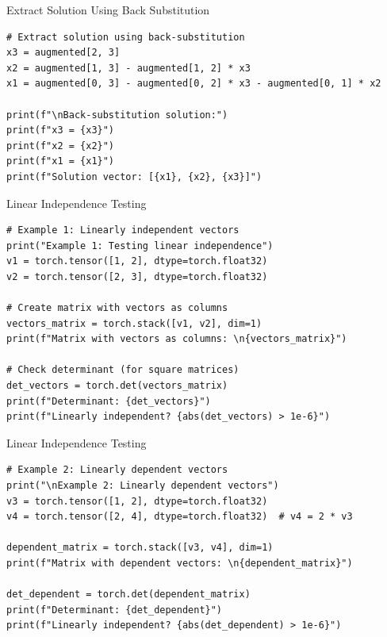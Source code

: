 \documentclass[aspectratio=169,xcolor=dvipsnames,svgnames,x11names,fleqn]{beamer}
\begin{document}
\begin{frame}[containsverbatim]{Extract Solution Using Back Substitution}
\begin{verbatim}
# Extract solution using back-substitution
x3 = augmented[2, 3]
x2 = augmented[1, 3] - augmented[1, 2] * x3
x1 = augmented[0, 3] - augmented[0, 2] * x3 - augmented[0, 1] * x2

print(f"\nBack-substitution solution:")
print(f"x3 = {x3}")
print(f"x2 = {x2}")
print(f"x1 = {x1}")
print(f"Solution vector: [{x1}, {x2}, {x3}]")
\end{verbatim}
\end{frame}



\begin{frame}[containsverbatim]{Linear Independence Testing}
\begin{verbatim}
# Example 1: Linearly independent vectors
print("Example 1: Testing linear independence")
v1 = torch.tensor([1, 2], dtype=torch.float32)
v2 = torch.tensor([2, 3], dtype=torch.float32)

# Create matrix with vectors as columns
vectors_matrix = torch.stack([v1, v2], dim=1)
print(f"Matrix with vectors as columns: \n{vectors_matrix}")

# Check determinant (for square matrices)
det_vectors = torch.det(vectors_matrix)
print(f"Determinant: {det_vectors}")
print(f"Linearly independent? {abs(det_vectors) > 1e-6}")
\end{verbatim}
\end{frame}


\begin{frame}[containsverbatim]{Linear Independence Testing}
\begin{verbatim}
# Example 2: Linearly dependent vectors
print("\nExample 2: Linearly dependent vectors")
v3 = torch.tensor([1, 2], dtype=torch.float32)
v4 = torch.tensor([2, 4], dtype=torch.float32)  # v4 = 2 * v3

dependent_matrix = torch.stack([v3, v4], dim=1)
print(f"Matrix with dependent vectors: \n{dependent_matrix}")

det_dependent = torch.det(dependent_matrix)
print(f"Determinant: {det_dependent}")
print(f"Linearly independent? {abs(det_dependent) > 1e-6}")
\end{verbatim}
\end{frame}
\end{document}
